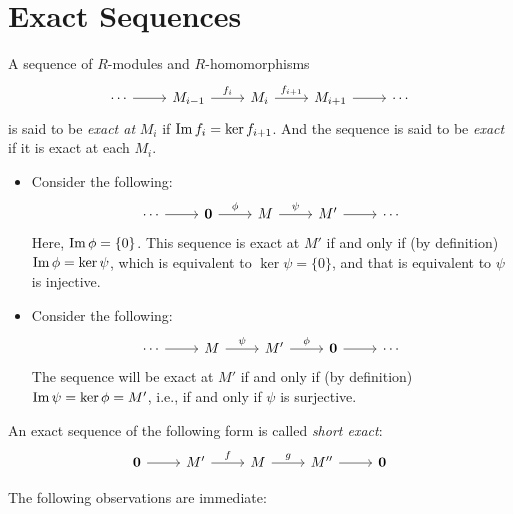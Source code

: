 \section{Exact Sequences}
\begin{definition}
    A sequence of \(R\)-modules and \(R\)-homomorphisms
    \[\begin{tikzcd}
	\cdots & {M_{i-1}} & {M_i} & {M_{i+1}} & \cdots
	\arrow[from=1-1, to=1-2]
	\arrow["{f_i}", from=1-2, to=1-3]
	\arrow["{f_{i+1}}", from=1-3, to=1-4]
	\arrow[from=1-4, to=1-5]
\end{tikzcd}\]
is said to be \textit{exact at} \(M_i\) if \(\operatorname{Im} f_i = \ker f_{i+1}\). And the sequence is said to be \textit{exact} if it is exact at each \(M_i\).
\end{definition}
\begin{remark}
\begin{itemize}
    \item Consider the following: \[\begin{tikzcd}
	\cdots & \mathbf{0} & M & M' & \cdots
	\arrow[from=1-1, to=1-2]
	\arrow["\phi", from=1-2, to=1-3]
	\arrow["\psi", from=1-3, to=1-4]
	\arrow[from=1-4, to=1-5]
\end{tikzcd}\]
Here, \(\operatorname{Im} \phi = \{0\}\). This sequence is exact at \(M'\) if and only if (by definition) \(\operatorname{Im} \phi  = \ker \psi\), which is equivalent to \(\ker \psi = \{0\}\), and that is equivalent to \(\psi\) is injective.
\item Consider the following:
\[\begin{tikzcd}
	\cdots & M & {M'} & {\mathbf{0}} & \cdots
	\arrow[from=1-1, to=1-2]
	\arrow["\psi", from=1-2, to=1-3]
	\arrow["\phi", from=1-3, to=1-4]
	\arrow[from=1-4, to=1-5]
\end{tikzcd}\]
The sequence will be exact at \(M'\) if and only if (by definition) \(\operatorname{Im} \psi = \ker \phi = M'\), i.e., if and only if \(\psi\) is surjective.
\end{itemize}
\end{remark}
\begin{definition}
    An exact sequence of the following form is called \textit{short exact}:
    \[\begin{tikzcd}
	{\mathbf{0}} & {M'} & M & {M''} & {\mathbf{0}}
	\arrow[from=1-1, to=1-2]
	\arrow["f", from=1-2, to=1-3]
	\arrow["g", from=1-3, to=1-4]
	\arrow[from=1-4, to=1-5]
\end{tikzcd}\]
\end{definition}
The following observations are immediate:
